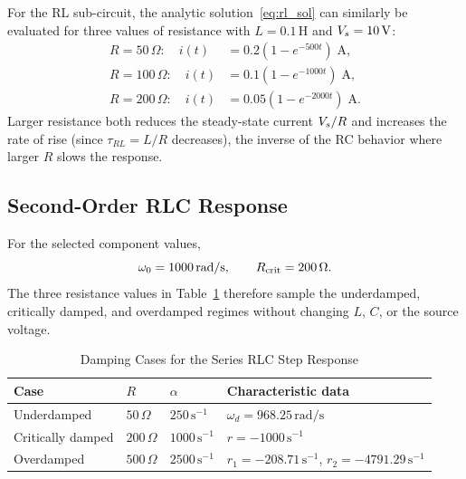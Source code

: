 For the RL sub-circuit, the analytic solution~\eqref{eq:rl_sol} can similarly
be evaluated for three values of resistance with $L = 0.1\,\mathrm{H}$ and
$V_s = 10\,\mathrm{V}$:
\begin{align}
  R=50\,\Omega: \quad i(t) &= 0.2\left(1 - e^{-500t}\right)\;\mathrm{A},
    \label{eq:rl_r_50}\\
  R=100\,\Omega: \quad i(t) &= 0.1\left(1 - e^{-1000t}\right)\;\mathrm{A},
    \label{eq:rl_r_100}\\
  R=200\,\Omega: \quad i(t) &= 0.05\left(1 - e^{-2000t}\right)\;\mathrm{A}.
    \label{eq:rl_r_200}
\end{align}
Larger resistance both reduces the steady-state current $V_s/R$ and
increases the rate of rise (since $\tau_{RL} = L/R$ decreases), the inverse
of the RC behavior where larger $R$ slows the response.

\subsection{Second-Order RLC Response}
\label{ssec:rlc_results}

For the selected component values,
\begin{equation}
  \omega_0 = 1000\,\mathrm{rad/s}, \qquad
  R_{\mathrm{crit}} = 200\,\Omega.
  \label{eq:numerical_omega_rcrit}
\end{equation}
The three resistance values in Table~\ref{tab:damping-cases} therefore
sample the underdamped, critically damped, and overdamped regimes without
changing $L$, $C$, or the source voltage.

\begin{table}[!t]
  \caption{Damping Cases for the Series RLC Step Response}
  \label{tab:damping-cases}
  \centering
  \begin{tabular}{@{}llll@{}}
    \toprule
    Case & $R$ & $\alpha$ & Characteristic data \\
    \midrule
    Underdamped & $50\,\Omega$ & $250\,\mathrm{s}^{-1}$
      & $\omega_d = 968.25\,\mathrm{rad/s}$ \\
    Critically damped & $200\,\Omega$ & $1000\,\mathrm{s}^{-1}$
      & $r = -1000\,\mathrm{s}^{-1}$ \\
    Overdamped & $500\,\Omega$ & $2500\,\mathrm{s}^{-1}$
      & $r_1 = -208.71\,\mathrm{s}^{-1}$,
        $r_2 = -4791.29\,\mathrm{s}^{-1}$ \\
    \bottomrule
  \end{tabular}
\end{table}

